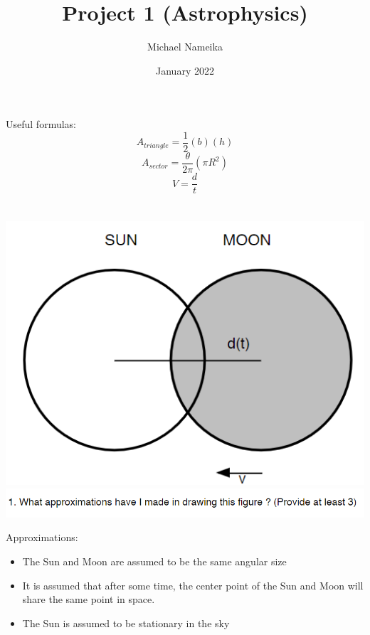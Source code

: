 \documentclass{article}
\title{Project 1 (Astrophysics)}
\author{Michael Nameika}
\date{January 2022}
\begin{document}
\maketitle
Useful formulas:
\begin{equation}
    A_{triangle} = \frac{1}{2}(b)(h)
\end{equation}
\begin{equation}
    A_{sector} = \frac{\theta}{2\pi}(\pi R^2)
\end{equation}
\begin{equation}
    V = \frac{d}{t}
\end{equation}

\section{}
\begin{center}
    \includegraphics[scale = 0.8]{eclipsepic.PNG}
    \newline\newline
    \includegraphics[scale = 0.8]{projectq1.PNG}
\end{center}

Approximations:
\begin{itemize}
    \item The Sun and Moon are assumed to be the same angular size
    \item It is assumed that after some time, the center point of the Sun and Moon will share the same point in space.
    \item The Sun is assumed to be stationary in the sky
\end{itemize}
\end{document}
